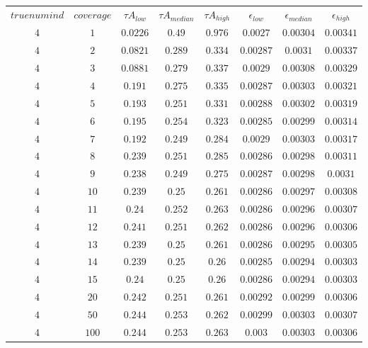 \begin{table}[H]
\begin{tabular}{cccccccc}
$truenumind$ & $coverage$ & ${\tau}A_{low}$ & ${\tau}A_{median}$ & ${\tau}A_{high}$ & $\epsilon_{low}$ & $\epsilon_{median}$ & $\epsilon_{high}$\\
$4$ & $1$ & $0.0226$ & $0.49$ & $0.976$ & $0.0027$ & $0.00304$ & $0.00341$\\
$4$ & $2$ & $0.0821$ & $0.289$ & $0.334$ & $0.00287$ & $0.0031$ & $0.00337$\\
$4$ & $3$ & $0.0881$ & $0.279$ & $0.337$ & $0.0029$ & $0.00308$ & $0.00329$\\
$4$ & $4$ & $0.191$ & $0.275$ & $0.335$ & $0.00287$ & $0.00303$ & $0.00321$\\
$4$ & $5$ & $0.193$ & $0.251$ & $0.331$ & $0.00288$ & $0.00302$ & $0.00319$\\
$4$ & $6$ & $0.195$ & $0.254$ & $0.323$ & $0.00285$ & $0.00299$ & $0.00314$\\
$4$ & $7$ & $0.192$ & $0.249$ & $0.284$ & $0.0029$ & $0.00303$ & $0.00317$\\
$4$ & $8$ & $0.239$ & $0.251$ & $0.285$ & $0.00286$ & $0.00298$ & $0.00311$\\
$4$ & $9$ & $0.238$ & $0.249$ & $0.275$ & $0.00287$ & $0.00298$ & $0.0031$\\
$4$ & $10$ & $0.239$ & $0.25$ & $0.261$ & $0.00286$ & $0.00297$ & $0.00308$\\
$4$ & $11$ & $0.24$ & $0.252$ & $0.263$ & $0.00286$ & $0.00296$ & $0.00307$\\
$4$ & $12$ & $0.241$ & $0.251$ & $0.262$ & $0.00286$ & $0.00296$ & $0.00306$\\
$4$ & $13$ & $0.239$ & $0.25$ & $0.261$ & $0.00286$ & $0.00295$ & $0.00305$\\
$4$ & $14$ & $0.239$ & $0.25$ & $0.26$ & $0.00285$ & $0.00294$ & $0.00303$\\
$4$ & $15$ & $0.24$ & $0.25$ & $0.26$ & $0.00286$ & $0.00294$ & $0.00303$\\
$4$ & $20$ & $0.242$ & $0.251$ & $0.261$ & $0.00292$ & $0.00299$ & $0.00306$\\
$4$ & $50$ & $0.244$ & $0.253$ & $0.262$ & $0.00299$ & $0.00303$ & $0.00307$\\
$4$ & $100$ & $0.244$ & $0.253$ & $0.263$ & $0.003$ & $0.00303$ & $0.00306$\\
\end{tabular}
\end{table}
 